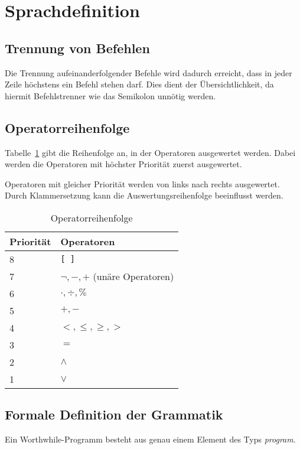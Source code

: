 \section{Sprachdefinition}

\subsection{Trennung von Befehlen}

Die Trennung aufeinanderfolgender Befehle wird dadurch erreicht, dass in jeder Zeile höchstens ein Befehl stehen darf. Dies dient der Übersichtlichkeit, da hiermit Befehlstrenner wie das Semikolon unnötig werden.

\subsection{Operatorreihenfolge}

Tabelle~\ref{operators} gibt die Reihenfolge an, in der Operatoren ausgewertet werden. Dabei werden die Operatoren mit höchster Priorität zuerst ausgewertet.

Operatoren mit gleicher Priorität werden von links nach rechts ausgewertet. Durch Klammersetzung kann die Auswertungsreihenfolge beeinflusst werden.

\begin{table}[h]
\centering
\label{operators}
\caption{Operatorreihenfolge}
\begin{tabular}{|l|l|}
\hline
\textbf{Priorität} & \textbf{Operatoren} \\
\hline
8 & \texttt{{[}\,{]}} \\
\hline
7 & $\neg, -, +$ (unäre Operatoren)\\
\hline
6 & $\cdot, \div, \%$\\
\hline
5 & $+, -$\\
\hline
4 & $<, \leq, \geq, >$\\
\hline
3 & $=$\\
\hline
2 & $\wedge$ \\
\hline
1 & $\vee$ \\
\hline
\end{tabular}
\end{table}

\subsection{Formale Definition der Grammatik}

Ein Worthwhile-Programm besteht aus genau einem Element des Typs \textit{program}.

